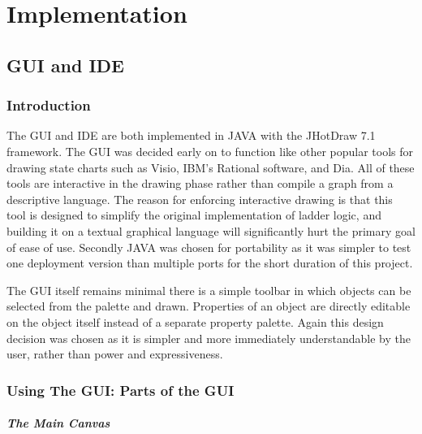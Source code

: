 \section{Implementation}
\subsection{GUI and IDE}
\label{IDE}
\subsubsection{Introduction}

The GUI and IDE are both implemented in JAVA with the JHotDraw 7.1 framework. The GUI was decided early on to function like other popular tools for drawing state charts such as Visio, IBM's Rational software, and Dia. All of these tools are interactive in the drawing phase rather than compile a graph from a descriptive language. The reason for enforcing interactive drawing is that this tool is designed to simplify the original implementation of ladder logic, and building it on a textual graphical language will significantly hurt the primary goal of ease of use. Secondly JAVA was chosen for portability as it was simpler to test one deployment version than multiple ports for the short duration of this project.

The GUI itself remains minimal 
there is a simple toolbar in which objects can be selected from the palette and drawn. Properties of an object are directly editable on the object itself 
instead of a separate property palette. Again this design decision was chosen as it is simpler and more immediately understandable by the user, rather than power and expressiveness.

\subsubsection{Using The GUI: Parts of the GUI}

\subparagraph{The Main Canvas}

